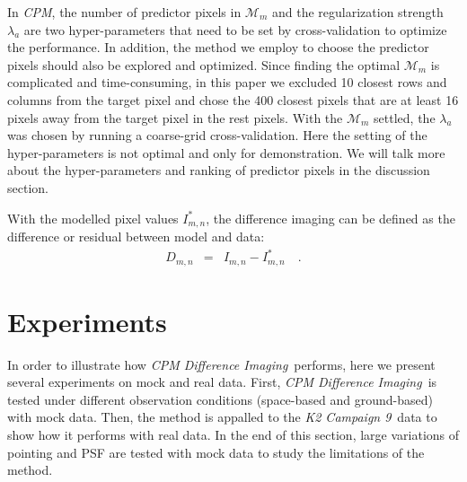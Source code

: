 \documentclass[12pt, preprint]{aastex}
\newcommand{\project}[1]{\textsl{#1}}
\newcommand{\cpm}{\project{CPM}}
\newcommand{\cpmdiff}{\project{CPM Difference Imaging}}
\newcommand{\KTCN}{\project{K2 Campaign 9}}
\newcommand{\set}[1]{\mathcal{#1}}
\begin{document}
In \cpm, the number of predictor pixels in $\set{M}_m$ and the regularization strength $\lambda_{a}$ are two hyper-parameters that need to be set by cross-validation to optimize the performance. 
In addition, the method we employ to choose the predictor pixels should also be explored and optimized.
Since finding the optimal $\set{M}_m$ is complicated and time-consuming, in this paper we excluded 10 closest rows and columns from the target pixel and chose the 400 closest pixels that are at least 16 pixels away from the target pixel in the rest pixels.
With the $\set{M}_m$ settled,  the $\lambda_{a}$ was chosen by running a coarse-grid cross-validation. 
Here the setting of the hyper-parameters is not optimal and only for demonstration. 
We will talk more about the hyper-parameters and ranking of predictor pixels in the discussion section.

With the modelled pixel values $I^{\ast}_{m,n}$, the difference imaging can be defined as the difference or residual between model and data:
\begin{eqnarray}
D_{m,n} &=& I_{m,n} - I^{\ast}_{m,n}
\quad.
\end{eqnarray}

\section{Experiments}
In order to illustrate how \cpmdiff\ performs, here we present several experiments on mock and real data. 
First, \cpmdiff\ is tested under different observation conditions (space-based and ground-based) with mock data. 
Then,  the method is appalled to the \KTCN\ data to show how it performs with real data. 
In the end of this section,  large variations of pointing and PSF are tested with mock data to study the limitations of the method.
\end{document}
